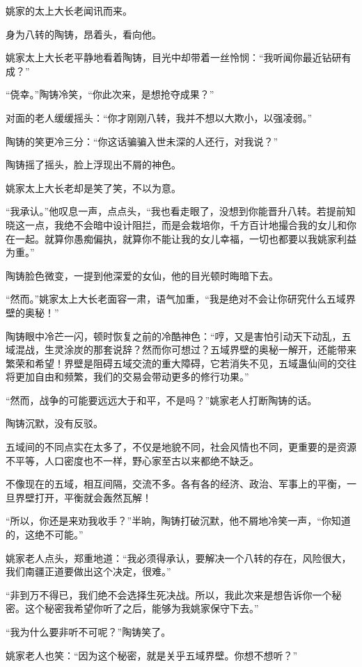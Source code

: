 \begin{this_body}
姚家的太上大长老闻讯而来。

身为八转的陶铸，昂着头，看向他。

姚家太上大长老平静地看着陶铸，目光中却带着一丝怜悯：“我听闻你最近钻研有成？”

“侥幸。”陶铸冷笑，“你此次来，是想抢夺成果？”

对面的老人缓缓摇头：“你才刚刚八转，我并不想以大欺小，以强凌弱。”

陶铸的笑更冷三分：“你这话骗骗入世未深的人还行，对我说？”

陶铸摇了摇头，脸上浮现出不屑的神色。

姚家太上大长老却是笑了笑，不以为意。

“我承认。”他叹息一声，点点头，“我也看走眼了，没想到你能晋升八转。若提前知晓这一点，我绝不会暗中设计阻拦，而是会栽培你，千方百计地撮合我的女儿和你在一起。就算你愚痴偏执，就算你不能让我的女儿幸福，一切也都要以我姚家利益为重。”

陶铸脸色微变，一提到他深爱的女仙，他的目光顿时晦暗下去。

“然而。”姚家太上大长老面容一肃，语气加重，“我是绝对不会让你研究什么五域界壁的奥秘！”

陶铸眼中冷芒一闪，顿时恢复之前的冷酷神色：“哼，又是害怕引动天下动乱，五域混战，生灵涂炭的那套说辞？然而你可想过？五域界壁的奥秘一解开，还能带来繁荣和希望！界壁是阻碍五域交流的重大障碍，它若消失不见，五域蛊仙间的交往将更加自由和频繁，我们的交易会带动更多的修行功果。”

“然而，战争的可能要远远大于和平，不是吗？”姚家老人打断陶铸的话。

陶铸沉默，没有反驳。

五域间的不同点实在太多了，不仅是地貌不同，社会风情也不同，更重要的是资源不平等，人口密度也不一样，野心家至古以来都绝不缺乏。

不像现在的五域，相互间隔，交流不多。各有各的经济、政治、军事上的平衡，一旦界壁打开，平衡就会轰然瓦解！

“所以，你还是来劝我收手？”半晌，陶铸打破沉默，他不屑地冷笑一声，“你知道的，这绝不可能。”

姚家老人点头，郑重地道：“我必须得承认，要解决一个八转的存在，风险很大，我们南疆正道要做出这个决定，很难。”

“非到万不得已，我们绝不会选择生死决战。所以，我此次来是想告诉你一个秘密。这个秘密我希望你听了之后，能够为我姚家保守下去。”

“我为什么要非听不可呢？”陶铸笑了。

姚家老人也笑：“因为这个秘密，就是关乎五域界壁。你想不想听？”


\end{this_body}
